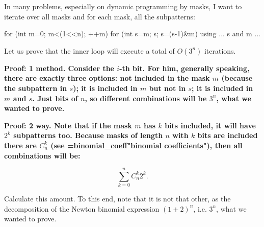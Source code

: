 In many problems, especially on dynamic programming by masks, I want to iterate over all masks and for each mask, all the subpatterns:

\code
for (int m=0; m<(1<<n); ++m)
for (int s=m; s; s=(s-1)&m)
using ... s and m ...
\endcode

Let us prove that the inner loop will execute a total of $O (3^n)$ iterations.

\bf{Proof: 1 method}. Consider the $i$-th bit. For him, generally speaking, there are exactly three options: not included in the mask $m$ (because the subpattern in $s$); it is included in $m$ but not in $s$; it is included in $m$ and $s$. Just bits of $n$, so different combinations will be $3^n$, what we wanted to prove.

\bf{Proof: 2 way}. Note that if the mask $m$ has $k$ bits included, it will have $2^k$ subpatterns too. Because masks of length $n$ with $k$ bits are included there are $C_n^k$ (see \algohref=binomial_coeff{"binomial coefficients"}), then all combinations will be:

$$ \sum_{k=0}^n C_n^k 2^k. $$

Calculate this amount. To this end, note that it is not that other, as the decomposition of the Newton binomial expression $(1+2)^n$, i.e. $3^n$, what we wanted to prove.
